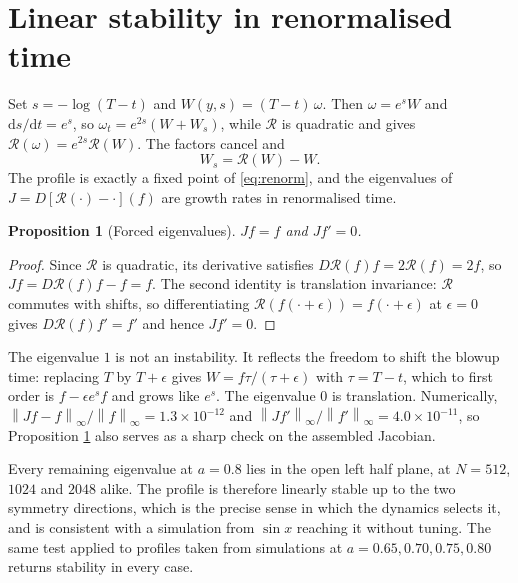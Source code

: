 \documentclass[11pt]{article}
\newtheorem{proposition}{Proposition}
\theoremstyle{definition}
\newcommand{\norm}[1]{\left\lVert #1 \right\rVert}
\begin{document}
\section{Linear stability in renormalised time}
\label{sec:spectrum}

Set $s = -\log(T-t)$ and $W(y,s) = (T-t)\,\omega$. Then $\omega = e^s W$ and
$\mathrm{d}s/\mathrm{d}t = e^s$, so $\omega_t = e^{2s}(W + W_s)$, while
$\mathcal{R}$ is quadratic and gives $\mathcal{R}(\omega)=e^{2s}\mathcal{R}(W)$.
The factors cancel and
\begin{equation}
  W_s = \mathcal{R}(W) - W.
  \label{eq:renorm}
\end{equation}
The profile is exactly a fixed point of \eqref{eq:renorm}, and the eigenvalues
of $J = D[\mathcal{R}(\cdot)-\cdot](f)$ are growth rates in renormalised time.

\begin{proposition}[Forced eigenvalues]
\label{prop:forced}
$Jf = f$ and $Jf' = 0$.
\end{proposition}

\begin{proof}
Since $\mathcal{R}$ is quadratic, its derivative satisfies
$D\mathcal{R}(f)f = 2\mathcal{R}(f) = 2f$, so
$Jf = D\mathcal{R}(f)f - f = f$. The second identity is translation
invariance: $\mathcal{R}$ commutes with shifts, so differentiating
$\mathcal{R}(f(\cdot+\epsilon)) = f(\cdot+\epsilon)$ at $\epsilon=0$ gives
$D\mathcal{R}(f)f' = f'$ and hence $Jf'=0$.
\end{proof}

The eigenvalue $1$ is not an instability. It reflects the freedom to shift the
blowup time: replacing $T$ by $T+\epsilon$ gives
$W = f\tau/(\tau+\epsilon)$ with $\tau = T-t$, which to first order is
$f - \epsilon e^s f$ and grows like $e^s$. The eigenvalue $0$ is translation.
Numerically, $\norm{Jf-f}_\infty/\norm{f}_\infty = 1.3\times10^{-12}$ and
$\norm{Jf'}_\infty/\norm{f'}_\infty = 4.0\times10^{-11}$, so Proposition
\ref{prop:forced} also serves as a sharp check on the assembled Jacobian.

Every remaining eigenvalue at $a=0.8$ lies in the open left half plane, at
$N=512$, $1024$ and $2048$ alike. The profile is therefore linearly stable up
to the two symmetry directions, which is the precise sense in which the
dynamics selects it, and is consistent with a simulation from $\sin x$ reaching
it without tuning. The same test applied to profiles taken from simulations at
$a=0.65,0.70,0.75,0.80$ returns stability in every case.
\end{document}
